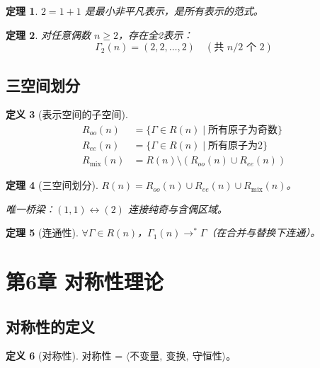 \documentclass[12pt]{article}
\newtheorem{theorem}{定理}[section]
\theoremstyle{definition}
\newtheorem{definition}[theorem]{定义}
\begin{document}
\begin{theorem}
\(2=1+1\) 是最小非平凡表示，是所有表示的范式。
\end{theorem}

\begin{theorem}
对任意偶数 \(n \geq 2\)，存在全2表示：
\[
\Gamma_2(n) = (2,2,\dots,2) \quad (\text{共 } n/2 \text{ 个 } 2)
\]
\end{theorem}

\subsection{三空间划分}

\begin{definition}[表示空间的子空间]
\begin{align*}
R_{oo}(n) &= \{\Gamma \in R(n) \mid \text{所有原子为奇数}\} \\
R_{ee}(n) &= \{\Gamma \in R(n) \mid \text{所有原子为2}\} \\
R_{\text{mix}}(n) &= R(n) \setminus (R_{oo}(n) \cup R_{ee}(n))
\end{align*}
\end{definition}

\begin{theorem}[三空间划分]
\(R(n) = R_{oo}(n) \cup R_{ee}(n) \cup R_{\text{mix}}(n)\)。

唯一桥梁：\((1,1) \leftrightarrow (2)\) 连接纯奇与含偶区域。
\end{theorem}

\begin{theorem}[连通性]
\(\forall \Gamma \in R(n)\)，\(\Gamma_1(n) \rightarrow^* \Gamma\)（在合并与替换下连通）。
\end{theorem}

\newpage


\section{第6章 对称性理论}

\subsection{对称性的定义}

\begin{definition}[对称性]
对称性 = \(\langle \text{不变量},\ \text{变换},\ \text{守恒性} \rangle\)。
\end{definition}
\end{document}
